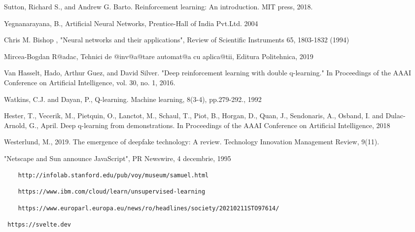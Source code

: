 \begin{thebibliography}{99}
 Sutton, Richard S., and Andrew G. Barto. Reinforcement learning: An introduction. MIT press, 2018.

 Yegnanarayana, B., Artificial Neural Networks, Prentice-Hall of India Pvt.Ltd. 2004

 Chris M. Bishop , "Neural networks and their applications", Review of Scientific Instruments 65, 1803-1832 (1994)

 Mircea-Bogdan R@adac, Tehnici de @inv@a@tare automat@a cu aplica@tii, Editura Politehnica, 2019 

 Van Hasselt, Hado, Arthur Guez, and David Silver. "Deep reinforcement learning with double q-learning." In Proceedings of the AAAI Conference on Artificial Intelligence, vol. 30, no. 1, 2016.

 Watkins, C.J. and Dayan, P., Q-learning. Machine learning, 8(3-4), pp.279-292., 1992 

 Hester, T., Vecerik, M., Pietquin, O., Lanctot, M., Schaul, T., Piot, B., Horgan, D., Quan, J., Sendonaris, A., Osband, I. and Dulac-Arnold, G.,  April. Deep q-learning from demonstrations. In Proceedings of the AAAI Conference on Artificial Intelligence, 2018 

 Westerlund, M., 2019. The emergence of deepfake technology: A review. Technology Innovation Management Review, 9(11).



 "Netscape and Sun announce JavaScript", PR Newswire, 4 decembrie, 1995

 \begin{verbatim}
	http://infolab.stanford.edu/pub/voy/museum/samuel.html
\end{verbatim}

 \begin{verbatim}
	https://www.ibm.com/cloud/learn/unsupervised-learning
\end{verbatim}

 \begin{verbatim}
	https://www.europarl.europa.eu/news/ro/headlines/society/20210211STO97614/
\end{verbatim}

 \begin{verbatim} https://svelte.dev 
\end{verbatim}


\end{thebibliography}
